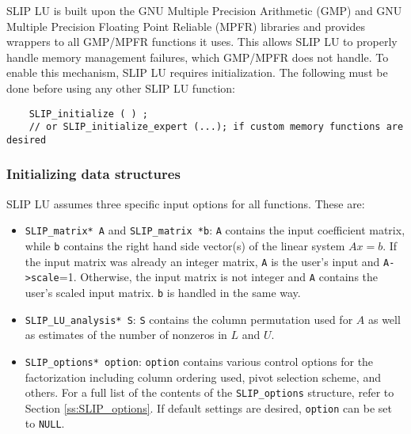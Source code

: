 \documentclass[12pt]{article}
\theoremstyle{definition}
\begin{document}
SLIP LU is built upon the GNU Multiple Precision Arithmetic (GMP)
\cite{granlund2015gnu} and GNU Multiple Precision Floating Point Reliable
(MPFR) \cite{fousse2007mpfr} libraries and provides wrappers to all GMP/MPFR
functions it uses.  This allows SLIP LU to properly handle memory management
failures, which GMP/MPFR does not handle.  To enable this mechanism, SLIP LU
requires initialization.  The following must be done before using any other
SLIP LU function:

\begin{mdframed}[userdefinedwidth=6in]
{\footnotesize
\begin{verbatim}
    SLIP_initialize ( ) ;
    // or SLIP_initialize_expert (...); if custom memory functions are desired
\end{verbatim}
} \end{mdframed}

\subsubsection{Initializing data structures}
\label{ss:init}

SLIP LU assumes three specific input options for all functions. These are:

\begin{itemize}
\item \verb|SLIP_matrix* A| and \verb|SLIP_matrix *b|: \verb|A| contains the
input coefficient matrix, while \verb|b| contains the right hand side vector(s)
of the linear system $Ax=b$.
If the input matrix was already an integer matrix, \verb|A| is the user's input
and \verb|A->scale|=1. Otherwise, the input matrix is not integer and \verb|A|
contains the user's scaled input matrix. \verb|b| is handled in the same way.

\item \verb|SLIP_LU_analysis* S|: \verb|S| contains the column permutation used
for $A$ as well as estimates of the number of nonzeros in $L$ and $U$.

\item \verb|SLIP_options* option|: \verb|option| contains various control
options for the factorization including column ordering used, pivot selection
scheme, and others. For a full list of the contents of the \verb|SLIP_options|
structure, refer to Section \ref{ss:SLIP_options}.
If default settings are desired, \verb|option| can be set to \verb|NULL|.

\end{itemize}
\end{document}
